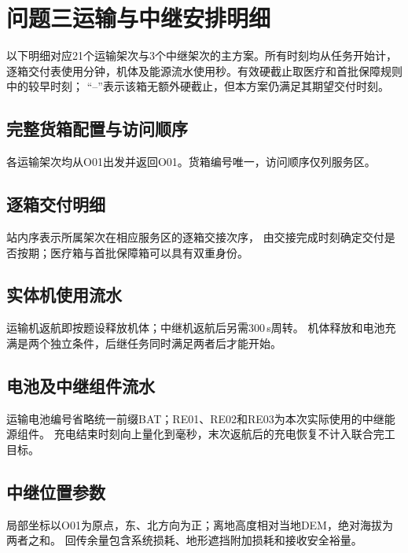 \begingroup
\captionsetup{font=small,skip=4pt}
\section{问题三运输与中继安排明细}
\label{app:q3-details}
以下明细对应21个运输架次与3个中继架次的主方案。所有时刻均从任务开始计，
逐箱交付表使用分钟，机体及能源流水使用秒。有效硬截止取医疗和首批保障规则中的较早时刻；
“--”表示该箱无额外硬截止，但本方案仍满足其期望交付时刻。

\subsection{完整货箱配置与访问顺序}
各运输架次均从O01出发并返回O01。货箱编号唯一，访问顺序仅列服务区。


\subsection{逐箱交付明细}
站内序表示所属架次在相应服务区的逐箱交接次序，
由交接完成时刻确定交付是否按期；医疗箱与首批保障箱可以具有双重身份。


\subsection{实体机使用流水}
运输机返航即按题设释放机体；中继机返航后另需300\,s周转。
机体释放和电池充满是两个独立条件，后继任务同时满足两者后才能开始。


\subsection{电池及中继组件流水}
运输电池编号省略统一前缀BAT；RE01、RE02和RE03为本次实际使用的中继能源组件。
充电结束时刻向上量化到毫秒，末次返航后的充电恢复不计入联合完工目标。


\subsection{中继位置参数}
局部坐标以O01为原点，东、北方向为正；离地高度相对当地DEM，绝对海拔为两者之和。
回传余量包含系统损耗、地形遮挡附加损耗和接收安全裕量。

\par\endgroup
